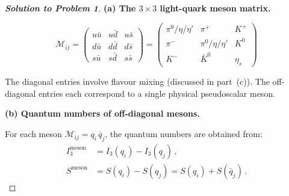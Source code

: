 \documentclass[11pt,a4paper]{article}
\begin{document}
\begin{proof}[\textbf{Solution to Problem 1}]

\textbf{(a) The $3 \times 3$ light-quark meson matrix.}

\[
  \mathcal{M}_{ij} =
  \begin{pmatrix}
    u\bar{u} & u\bar{d} & u\bar{s} \\
    d\bar{u} & d\bar{d} & d\bar{s} \\
    s\bar{u} & s\bar{d} & s\bar{s}
  \end{pmatrix}
  =
  \begin{pmatrix}
    \pi^0/\eta/\eta' & \pi^+ & K^+ \\
    \pi^- & \pi^0/\eta/\eta' & K^0 \\
    K^- & \bar{K}^0 & \eta_s
  \end{pmatrix}
\]

The diagonal entries involve flavour mixing (discussed in part~(c)).
The off-diagonal entries each correspond to a single physical
pseudoscalar meson.

\bigskip

\textbf{(b) Quantum numbers of off-diagonal mesons.}

For each meson $\mathcal{M}_{ij} = q_i\,\bar{q}_j$, the quantum
numbers are obtained from:
\begin{align*}
  I_3^{\text{meson}} &= I_3(q_i) - I_3(q_j)\,, \\
  S^{\text{meson}} &= S(q_i) - S(q_j)
    = S(q_i) + S(\bar{q}_j)\,.
\end{align*}


\end{proof}
\end{document}
